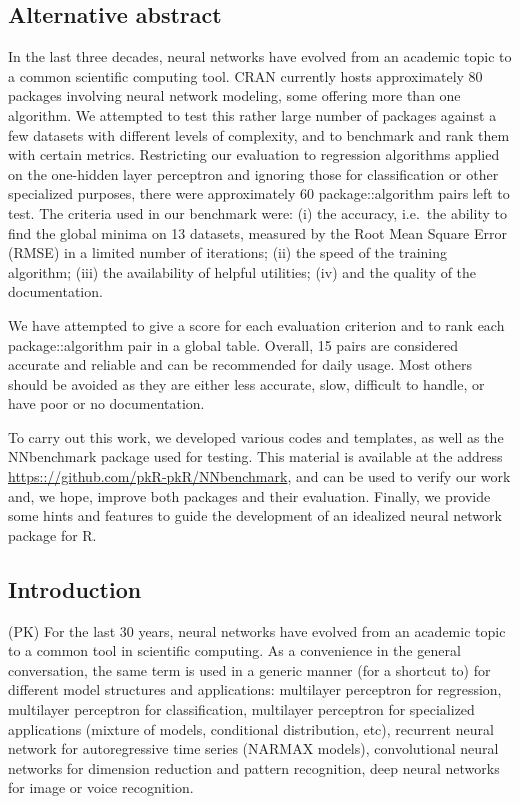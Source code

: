 \hypertarget{alternative-abstract}{%
\subsection{Alternative abstract}\label{alternative-abstract}}

In the last three decades, neural networks have evolved from an academic
topic to a common scientific computing tool. CRAN currently hosts
approximately 80 packages involving neural network modeling, some
offering more than one algorithm. We attempted to test this rather large
number of packages against a few datasets with different levels of
complexity, and to benchmark and rank them with certain metrics.
Restricting our evaluation to regression algorithms applied on the
one-hidden layer perceptron and ignoring those for classification or
other specialized purposes, there were approximately 60
package::algorithm pairs left to test. The criteria used in our
benchmark were: (i) the accuracy, i.e.~the ability to find the global
minima on 13 datasets, measured by the Root Mean Square Error (RMSE) in
a limited number of iterations; (ii) the speed of the training
algorithm; (iii) the availability of helpful utilities; (iv) and the
quality of the documentation.

We have attempted to give a score for each evaluation criterion and to
rank each package::algorithm pair in a global table. Overall, 15 pairs
are considered accurate and reliable and can be recommended for daily
usage. Most others should be avoided as they are either less accurate,
slow, difficult to handle, or have poor or no documentation.

To carry out this work, we developed various codes and templates, as
well as the NNbenchmark package used for testing. This material is
available at the address \url{https:://github.com/pkR-pkR/NNbenchmark},
and can be used to verify our work and, we hope, improve both packages
and their evaluation. Finally, we provide some hints and features to
guide the development of an idealized neural network package for R.

\hypertarget{introduction}{%
\subsection{Introduction}\label{introduction}}

(PK) For the last 30 years, neural networks have evolved from an
academic topic to a common tool in scientific computing. As a
convenience in the general conversation, the same term is used in a
generic manner (for a shortcut to) for different model structures and
applications: multilayer perceptron for regression, multilayer
perceptron for classification, multilayer perceptron for specialized
applications (mixture of models, conditional distribution, etc),
recurrent neural network for autoregressive time series (NARMAX models),
convolutional neural networks for dimension reduction and pattern
recognition, deep neural networks for image or voice recognition.

